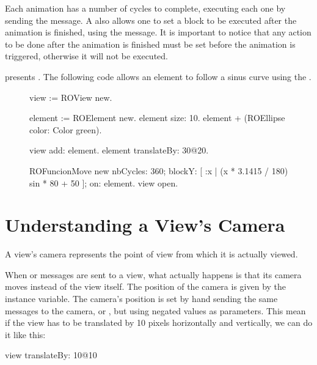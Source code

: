 \documentclass[a4paper,10pt,twoside]{book}
\begin{document}
Each animation has a number of cycles to complete, executing each one by sending the  message.
A  also allows one to set a block to be executed after the animation is finished, using the  message. It is important to notice that any action to be done after the animation is finished must be set before the animation is triggered, otherwise it will not be executed. %

 presents . The following code allows an element to follow a sinus curve using the .

\begin{figure}[H]
\begin{code}{}
view := ROView new.

element := ROElement new.
element size: 10.
element + (ROEllipse color: Color green).

view add: element.
element translateBy: 30@20.

ROFuncionMove new
	nbCycles: 360;
	blockY: [ :x | (x * 3.1415 / 180) sin * 80 + 50 ];
	on: element.
view open.
\end{code}
\label{fig:animationCode}
\end{figure}




\section{Understanding a View's Camera} 

A view's camera represents the point of view from which it is actually viewed. 

When  or  messages are sent to a view, what actually happens is that its camera moves instead of the view itself. The position of the camera is given by the  instance variable. The camera's position is set by hand sending the same messages to the camera,  or , but using negated values as parameters. This mean if the view has to be translated by 10 pixels horizontally and vertically, we can do it like this:

\begin{code}{}
view translateBy: 10@10
\end{code}
\end{document}
